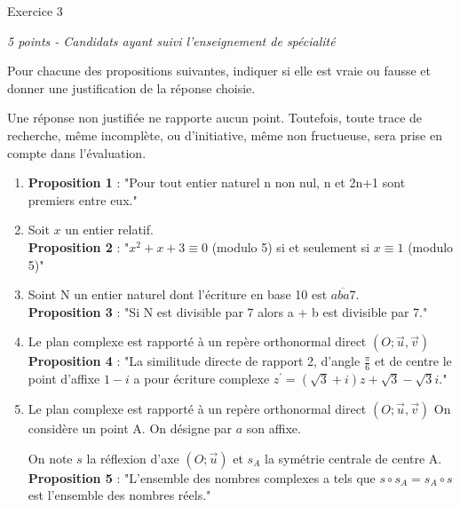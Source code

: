 
%
\begin{h2}Exercice 3\end{h2}
\textit{5 points - Candidats ayant suivi l'enseignement de spécialité}
\par
Pour chacune des propositions suivantes, indiquer si elle est vraie ou fausse et donner une justification de la réponse choisie.
\par
Une réponse non justifiée ne rapporte aucun point. Toutefois, toute trace de recherche, même incomplète, ou d'initiative, même non fructueuse, sera prise en compte dans l'évaluation.
\begin{enumerate}
     \item
     \textbf{Proposition 1} : "Pour tout entier naturel n non nul, n et 2n+1 sont premiers entre eux."
     \item
     Soit $x$ un entier relatif.
\\
     \textbf{Proposition 2} : "$x^{2}+x+3\equiv 0$ (modulo 5) si et seulement si $x \equiv 1$ (modulo 5)"
     \item
     Soint N un entier naturel dont l'écriture en base 10 est $\overline{aba7}$.
\\
     \textbf{Proposition 3} : "Si N est divisible par 7 alors a + b est divisible par 7."
     \item
     Le plan complexe est rapporté à un repère orthonormal direct $\left(O; \vec{u} , \vec{v}\right)$
\\
     \textbf{Proposition 4} : "La similitude directe de rapport 2, d'angle $\frac{\pi }{6}$ et de centre le point d'affixe $1-i$ a pour écriture complexe $z^{\prime}=\left(\sqrt{3}+i\right)z+\sqrt{3}-\sqrt{3}i$."
     \item
     Le plan complexe est rapporté à un repère orthonormal direct $\left(O; \vec{u}, \vec{v}\right)$	On considère un point A. On désigne par $a$ son affixe.
     \par
     On note $s$ la réflexion d'axe  $\left(O; \vec{u}\right)$ et $s_{A}$ la symétrie centrale de centre A.
\\
     \textbf{Proposition 5} : "L'ensemble des nombres complexes a tels que $s \circ s_{A}=s_{A} \circ s$ est l'ensemble des nombres réels."
\end{enumerate}
